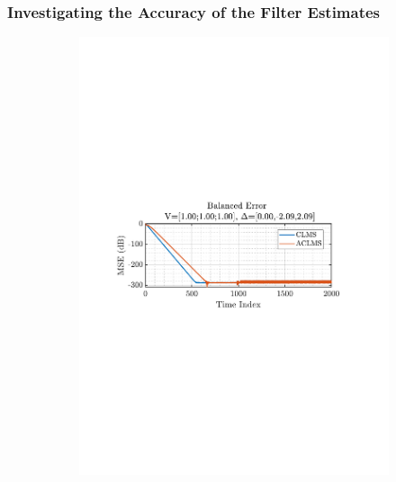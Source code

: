 \documentclass[12pt]{article}
\numberwithin{equation}{section}
\begin{document}
		\subsubsection{Investigating the Accuracy of the Filter Estimates}
			\begin{figure}[H]
				\centering
				\begin{subfigure}{0.49\textwidth}
					\centering
					\includegraphics[trim={2.2cm 11.2cm 3.00cm  11.2cm}, clip, width=\textwidth]{../MATLAB/figures/q3_1e_fig01.pdf} 
					\captionsetup{justification=centering}
				\end{subfigure}
				\begin{subfigure}{0.49\textwidth}
					\centering

\end{subfigure}
\end{figure}
\end{document}
